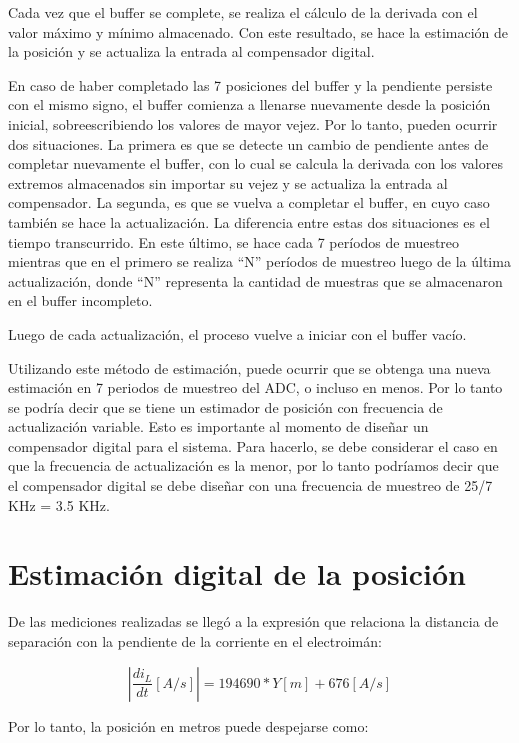 \noindent Cada vez que el buffer se complete, se realiza el cálculo de la derivada con el valor máximo y mínimo almacenado. Con este resultado, se hace la estimación de la posición y se actualiza la entrada al compensador digital.

\noindent En caso de haber completado las 7 posiciones del buffer y la pendiente persiste con el mismo signo, el buffer comienza a llenarse nuevamente desde la posición inicial, sobreescribiendo los valores de mayor vejez. Por lo tanto, pueden ocurrir dos situaciones. La primera es que se detecte un cambio de pendiente antes de completar nuevamente el buffer, con lo cual se calcula la derivada con los valores extremos almacenados sin importar su vejez y se actualiza la entrada al compensador. La segunda, es que se vuelva a completar el buffer, en cuyo caso también se hace la actualización. La diferencia entre estas dos situaciones es el tiempo transcurrido. En este último, se hace cada 7 períodos de muestreo mientras que en el primero se realiza “N” períodos de muestreo luego de la última actualización, donde “N” representa la cantidad de muestras que se almacenaron en el buffer incompleto.

\noindent Luego de cada actualización, el proceso vuelve a iniciar con el buffer vacío.

\noindent Utilizando este método de estimación, puede ocurrir que se obtenga una nueva estimación en 7 periodos de muestreo del ADC, o incluso en menos. Por lo tanto se podría decir que se tiene un estimador de posición con frecuencia de actualización variable. Esto es importante al momento de diseñar un compensador digital para el sistema. Para hacerlo, se debe considerar el caso en que la frecuencia de actualización es la menor, por lo tanto podríamos decir que el compensador digital se debe diseñar con una frecuencia de muestreo de 25/7 KHz = 3.5 KHz.

\section{Estimación digital de la posición}

\noindent De las mediciones realizadas se llegó a la expresión que relaciona la distancia de separación con la pendiente de la corriente en el electroimán:

\begin{equation} 
	|\frac{di_L}{dt}[A/s]| = 194690 * Y[m] + 676 [A/s]
\end{equation}

\noindent Por lo tanto, la posición en metros puede despejarse como:

